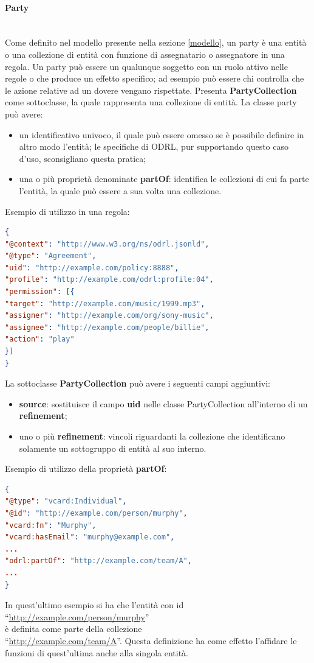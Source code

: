 \documentclass[12pt,a4paper,twoside]{book}
\begin{document}
\paragraph{Party}\mbox{}\\
Come definito nel modello presente nella sezione \ref{modello}, un party è una entità o una collezione di entità con funzione di assegnatario o assegnatore in una regola. Un party può essere un qualunque soggetto con un ruolo attivo nelle regole o che produce un effetto specifico; ad esempio può essere chi controlla che le azione relative ad un dovere vengano rispettate. Presenta \textbf{PartyCollection} come sottoclasse, la quale rappresenta una collezione di entità. La classe party può avere:
\begin{itemize}
	\item un identificativo univoco, il quale può essere omesso se è possibile definire in altro modo l'entità; le specifiche di ODRL, pur supportando questo caso d'uso, sconsigliano questa pratica;
	\item una o più proprietà denominate \textbf{partOf}: identifica le collezioni di cui fa parte l'entità, la quale può essere a sua volta una collezione.
\end{itemize}\newpage
Esempio di utilizzo in una regola:
\begin{lstlisting}[language=json,firstnumber=1,caption={Utilizzo di party nelle proprietà \textbf{assigner} ed \textbf{assignee} di una regola},captionpos=b,label=esempioParty]
{
"@context": "http://www.w3.org/ns/odrl.jsonld",
"@type": "Agreement",
"uid": "http://example.com/policy:8888",
"profile": "http://example.com/odrl:profile:04",
"permission": [{
"target": "http://example.com/music/1999.mp3",
"assigner": "http://example.com/org/sony-music",
"assignee": "http://example.com/people/billie",
"action": "play"
}]
}  
\end{lstlisting}
La sottoclasse \textbf{PartyCollection} può avere i seguenti campi aggiuntivi:
\begin{itemize}
	\item \textbf{source}: sostituisce il campo \textbf{uid} nelle classe PartyCollection all'interno di un \textbf{refinement};
	\item uno o più \textbf{refinement}: vincoli riguardanti la collezione che identificano solamente un sottogruppo di entità al suo interno.
\end{itemize}
Esempio di utilizzo della proprietà \textbf{partOf}:
\begin{lstlisting}[language=json,firstnumber=1,caption={L'entità definita è parte di una PartyCollection},captionpos=b,label=esempioPartyColl]
{
"@type": "vcard:Individual",
"@id": "http://example.com/person/murphy",
"vcard:fn": "Murphy",
"vcard:hasEmail": "murphy@example.com",
...
"odrl:partOf": "http://example.com/team/A",
...
}
\end{lstlisting}
In quest'ultimo esempio si ha che l'entità con id \\``\url{http://example.com/person/murphy}''\\è definita come parte della collezione\\``\url{http://example.com/team/A}''. Questa definizione ha come effetto l'affidare le funzioni di quest'ultima anche alla singola entità.
\end{document}
